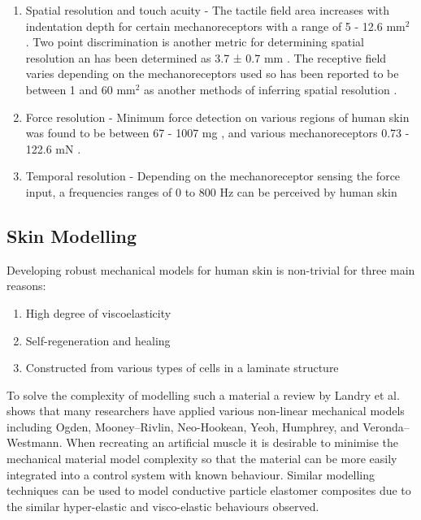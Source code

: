 \begin{enumerate}
    \item Spatial resolution and touch acuity - The tactile field area increases with indentation depth for certain mechanoreceptors with a range of 5 - 12.6 mm$^2$ \cite{Deflorio2022}. Two point discrimination is another metric for determining spatial resolution an has been determined as 3.7 ± 0.7 mm \cite{Yokota2020}. The receptive field varies depending on the mechanoreceptors used so has been reported to be between 1 and 60 mm$^2$ as another methods of inferring spatial resolution \cite{Roudaut2012}.
    \item Force resolution - Minimum force detection on various regions of human skin was found to be between 67 - 1007 mg \cite{Ackerley2014}, and various mechanoreceptors 0.73 - 122.6 mN \cite{Strzalkowski2015}.
    \item Temporal resolution - Depending on the mechanoreceptor sensing the force input, a frequencies ranges of 0 to 800 Hz can be perceived by human skin \cite{Deflorio2022}
\end{enumerate}


\subsection{Skin Modelling}
Developing robust mechanical models for human skin is non-trivial for three main reasons:
\begin{enumerate}
    \item High degree of viscoelasticity
    \item Self-regeneration and healing
    \item Constructed from various types of cells in a laminate structure 
\end{enumerate}
To solve the complexity of modelling such a material a review by Landry et al.\cite{Landry2021} shows that many researchers have applied various non-linear mechanical models including Ogden, Mooney–Rivlin, Neo-Hookean, Yeoh, Humphrey, and Veronda–Westmann. When recreating an artificial muscle it is desirable to minimise the mechanical material model complexity so that the material can be more easily integrated into a control system with known behaviour. Similar modelling techniques can be used to model conductive particle elastomer composites due to the similar hyper-elastic and visco-elastic behaviours observed.

